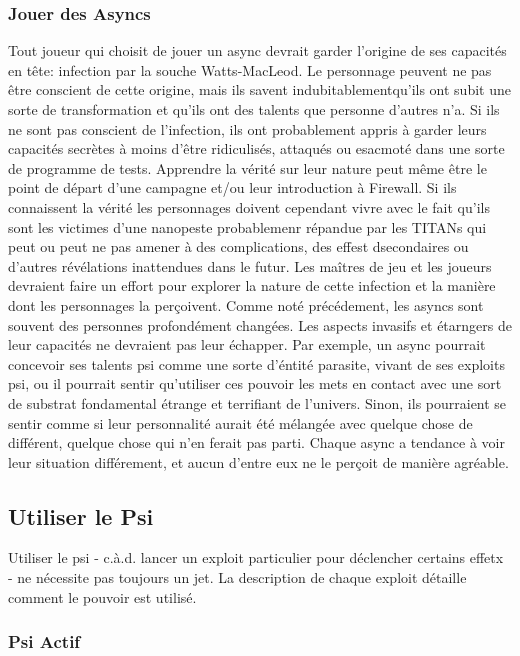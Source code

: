 \subsubsection{Jouer des Asyncs} 

Tout joueur qui choisit de jouer un async devrait garder l'origine de ses capacités en tête: infection par la souche Watts-MacLeod. Le personnage peuvent ne pas être conscient de cette origine, mais ils savent indubitablementqu'ils ont subit une sorte de transformation et qu'ils ont des talents que personne d'autres n'a. Si ils ne sont pas conscient de l'infection, ils ont probablement appris à garder leurs capacités secrètes à moins d'être ridiculisés, attaqués ou esacmoté dans une sorte de programme de tests. Apprendre la vérité sur leur nature peut même être le point de départ d'une campagne et/ou leur introduction à Firewall. Si ils connaissent la vérité les personnages doivent cependant vivre avec le fait qu'ils sont les victimes d'une nanopeste probablemenr répandue par les TITANs qui peut ou peut ne pas amener à des complications, des effest dsecondaires ou d'autres révélations inattendues dans le futur. Les maîtres de jeu et les joueurs devraient faire un effort pour explorer la nature de cette infection et la manière dont les personnages la perçoivent. Comme noté précédement, les asyncs sont souvent des personnes profondément changées. Les aspects invasifs et étarngers de leur capacités ne devraient pas leur échapper. Par exemple, un async pourrait concevoir ses talents psi comme une sorte d'éntité parasite, vivant de ses exploits psi, ou il pourrait sentir qu'utiliser ces pouvoir les mets en contact avec une sort de substrat fondamental étrange et terrifiant de l'univers. Sinon, ils pourraient se sentir comme si leur personnalité aurait été mélangée avec quelque chose de différent, quelque chose qui n'en ferait pas parti. Chaque async a tendance à voir leur situation différement, et aucun d'entre eux ne le perçoit de manière agréable. 

\subsection{Utiliser le Psi} 

Utiliser le psi - c.à.d. lancer un exploit particulier pour déclencher certains effetx - ne nécessite pas toujours un jet. La description de chaque exploit détaille comment le pouvoir est utilisé. 

\subsubsection{Psi Actif} 

